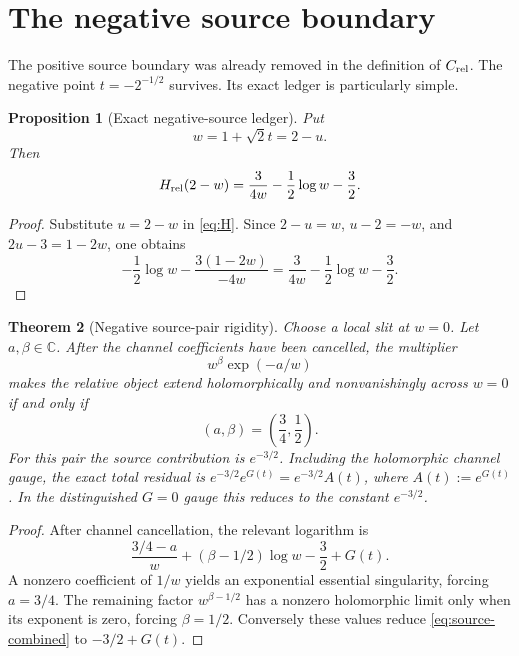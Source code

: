\documentclass[11pt]{article}
\newtheorem{theorem}{Theorem}[section]
\newtheorem{proposition}[theorem]{Proposition}
\newcommand{\Crel}{C_{\rm rel}}
\begin{document}
\section{The negative source boundary}

The positive source boundary was already removed in the definition of
\(\Crel\).  The negative point \(t=-2^{-1/2}\) survives.  Its exact ledger
is particularly simple.

\begin{proposition}[Exact negative-source ledger]\label{prop:negative-ledger}
Put
\begin{equation}\label{eq:w}
 w=1+\sqrt2t=2-u.
\end{equation}
Then
\begin{equation}\label{eq:H-w}
 H_{\rm rel}(2-w)=\frac{3}{4w}-\frac12\log w-\frac32.
\end{equation}
\end{proposition}

\begin{proof}
Substitute \(u=2-w\) in \cref{eq:H}.  Since
\(2-u=w\), \(u-2=-w\), and \(2u-3=1-2w\), one obtains
\[
 -\frac12\log w-
 \frac{3(1-2w)}{-4w}
 =\frac{3}{4w}-\frac12\log w-\frac32.
\]
\end{proof}

\begin{theorem}[Negative source-pair rigidity]\label{thm:source-rigidity}
Choose a local slit at \(w=0\).  Let \(a,\beta\in\mathbb C\).  After the
channel coefficients have been cancelled, the multiplier
\begin{equation}\label{eq:source-factor}
 w^\beta\exp(-a/w)
\end{equation}
makes the relative object extend holomorphically and nonvanishingly across
\(w=0\) if and only if
\begin{equation}\label{eq:forced-source}
 (a,\beta)=\left(\frac34,\frac12\right).
\end{equation}
For this pair the source contribution is \(e^{-3/2}\).  Including the
holomorphic channel gauge, the exact total residual is
\(e^{-3/2}e^{G(t)}=e^{-3/2}A(t)\), where \(A(t):=e^{G(t)}\).  In the
distinguished \(G=0\) gauge this reduces to the constant \(e^{-3/2}\).
\end{theorem}

\begin{proof}
After channel cancellation, the relevant logarithm is
\begin{equation}\label{eq:source-combined}
 \frac{3/4-a}{w}+(\beta-1/2)\log w-\frac32+G(t).
\end{equation}
A nonzero coefficient of \(1/w\) yields an exponential essential
singularity, forcing \(a=3/4\).  The remaining factor
\(w^{\beta-1/2}\) has a nonzero holomorphic limit only when its exponent is
zero, forcing \(\beta=1/2\).  Conversely these values reduce
\cref{eq:source-combined} to \(-3/2+G(t)\).
\end{proof}
\end{document}
